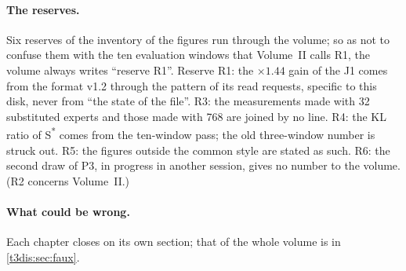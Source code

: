 \paragraph{The reserves.} Six reserves of the inventory of the figures run through the volume; so as not to confuse them with the ten evaluation windows that Volume~II calls R1, the volume always writes ``reserve R1''. Reserve R1: the $\times 1.44$ gain of the J1 comes from the format v1.2 through the pattern of its read requests, specific to this disk, never from ``the state of the file''. R3: the measurements made with 32 substituted experts and those made with 768 are joined by no line. R4: the KL ratio of S\textsuperscript{*} comes from the ten-window pass; the old three-window number is struck out. R5: the figures outside the common style are stated as such. R6: the second draw of P3, in progress in another session, gives no number to the volume. (R2 concerns Volume~II.)

\paragraph{What could be wrong.} Each chapter closes on its own section; that of the whole volume is in \cref{t3dis:sec:faux}.
